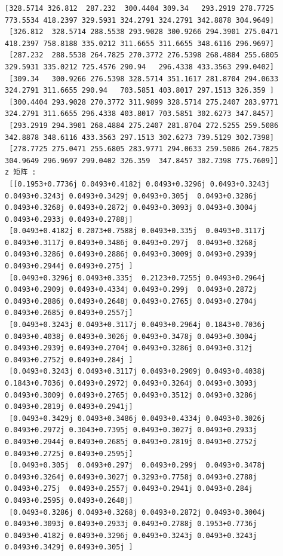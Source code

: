\documentclass[11pt]{article}
\begin{document}
\begin{Verbatim}[commandchars=\\\{\}]
 [328.5714 326.812  287.232  300.4404 309.34   293.2919 278.7725 773.5534 418.2397 329.5931 324.2791 324.2791 342.8878 304.9649]
 [326.812  328.5714 288.5538 293.9028 300.9266 294.3901 275.0471 418.2397 758.8188 335.0212 311.6655 311.6655 348.6116 296.9697]
 [287.232  288.5538 264.7825 270.3772 276.5398 268.4884 255.6805 329.5931 335.0212 725.4576 290.94   296.4338 433.3563 299.0402]
 [309.34   300.9266 276.5398 328.5714 351.1617 281.8704 294.0633 324.2791 311.6655 290.94   703.5851 403.8017 297.1513 326.359 ]
 [300.4404 293.9028 270.3772 311.9899 328.5714 275.2407 283.9771 324.2791 311.6655 296.4338 403.8017 703.5851 302.6273 347.8457]
 [293.2919 294.3901 268.4884 275.2407 281.8704 272.5255 259.5086 342.8878 348.6116 433.3563 297.1513 302.6273 739.5129 302.7398]
 [278.7725 275.0471 255.6805 283.9771 294.0633 259.5086 264.7825 304.9649 296.9697 299.0402 326.359  347.8457 302.7398 775.7609]]
z 矩阵 : 
 [[0.1953+0.7736j 0.0493+0.4182j 0.0493+0.3296j 0.0493+0.3243j 0.0493+0.3243j 0.0493+0.3429j 0.0493+0.305j  0.0493+0.3286j 0.0493+0.3268j 0.0493+0.2872j 0.0493+0.3093j 0.0493+0.3004j 0.0493+0.2933j 0.0493+0.2788j]
 [0.0493+0.4182j 0.2073+0.7588j 0.0493+0.335j  0.0493+0.3117j 0.0493+0.3117j 0.0493+0.3486j 0.0493+0.297j  0.0493+0.3268j 0.0493+0.3286j 0.0493+0.2886j 0.0493+0.3009j 0.0493+0.2939j 0.0493+0.2944j 0.0493+0.275j ]
 [0.0493+0.3296j 0.0493+0.335j  0.2123+0.7255j 0.0493+0.2964j 0.0493+0.2909j 0.0493+0.4334j 0.0493+0.299j  0.0493+0.2872j 0.0493+0.2886j 0.0493+0.2648j 0.0493+0.2765j 0.0493+0.2704j 0.0493+0.2685j 0.0493+0.2557j]
 [0.0493+0.3243j 0.0493+0.3117j 0.0493+0.2964j 0.1843+0.7036j 0.0493+0.4038j 0.0493+0.3026j 0.0493+0.3478j 0.0493+0.3004j 0.0493+0.2939j 0.0493+0.2704j 0.0493+0.3286j 0.0493+0.312j  0.0493+0.2752j 0.0493+0.284j ]
 [0.0493+0.3243j 0.0493+0.3117j 0.0493+0.2909j 0.0493+0.4038j 0.1843+0.7036j 0.0493+0.2972j 0.0493+0.3264j 0.0493+0.3093j 0.0493+0.3009j 0.0493+0.2765j 0.0493+0.3512j 0.0493+0.3286j 0.0493+0.2819j 0.0493+0.2941j]
 [0.0493+0.3429j 0.0493+0.3486j 0.0493+0.4334j 0.0493+0.3026j 0.0493+0.2972j 0.3043+0.7395j 0.0493+0.3027j 0.0493+0.2933j 0.0493+0.2944j 0.0493+0.2685j 0.0493+0.2819j 0.0493+0.2752j 0.0493+0.2725j 0.0493+0.2595j]
 [0.0493+0.305j  0.0493+0.297j  0.0493+0.299j  0.0493+0.3478j 0.0493+0.3264j 0.0493+0.3027j 0.3293+0.7758j 0.0493+0.2788j 0.0493+0.275j  0.0493+0.2557j 0.0493+0.2941j 0.0493+0.284j  0.0493+0.2595j 0.0493+0.2648j]
 [0.0493+0.3286j 0.0493+0.3268j 0.0493+0.2872j 0.0493+0.3004j 0.0493+0.3093j 0.0493+0.2933j 0.0493+0.2788j 0.1953+0.7736j 0.0493+0.4182j 0.0493+0.3296j 0.0493+0.3243j 0.0493+0.3243j 0.0493+0.3429j 0.0493+0.305j ]

\end{Verbatim}
\end{document}
